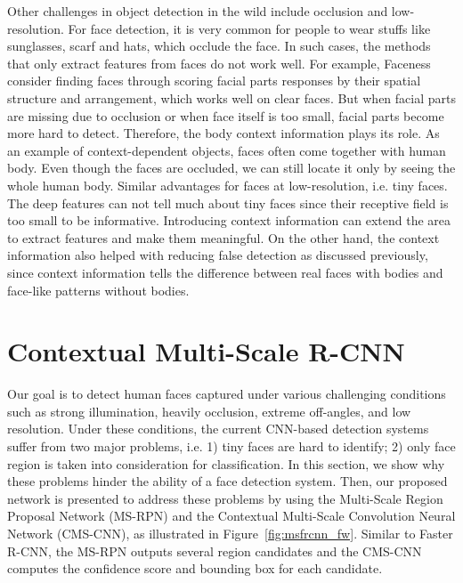 \documentclass[10pt,journal,cspaper,compsoc]{IEEEtran}
\begin{document}
Other challenges in object detection in the wild include occlusion and low-resolution. For face detection, it is very common for people to wear stuffs like sunglasses, scarf and hats, which occlude the face. In such cases, the methods that only extract features from faces do not work well. For example, Faceness \cite{yang2015faceness} consider finding faces through scoring facial parts responses by their spatial structure and arrangement, which works well on clear faces. But when facial parts are missing due to occlusion or when face itself is too small, facial parts become more hard to detect. Therefore, the body context information plays its role. As an example of context-dependent objects, faces often come together with human body. Even though the faces are occluded, we can still locate it only by seeing the whole human body. Similar advantages for faces at low-resolution, i.e. tiny faces. The deep features can not tell much about tiny faces since their receptive field is too small to be informative. Introducing context information can extend the area to extract features and make them meaningful. On the other hand, the context information also helped with reducing false detection as discussed previously, since context information tells the difference between real faces with bodies and face-like patterns without bodies. 












\section{Contextual Multi-Scale R-CNN}
\label{sec:Ourapproach}
Our goal is to detect human faces captured under various challenging conditions such as strong illumination, heavily occlusion, extreme off-angles, and low resolution. Under these conditions, the current CNN-based detection systems suffer from two major problems, i.e. 1) tiny faces are hard to identify; 2) only face region is taken into consideration for classification. In this section, we show why these problems hinder the ability of a face detection system. Then, our proposed network is presented to address these problems by using the Multi-Scale Region Proposal Network (MS-RPN) and the Contextual Multi-Scale Convolution Neural Network (CMS-CNN), as illustrated in Figure~\ref{fig:msfrcnn_fw}. Similar to Faster R-CNN, the MS-RPN outputs several region candidates and the CMS-CNN computes the confidence score and bounding box for each candidate.
\end{document}
